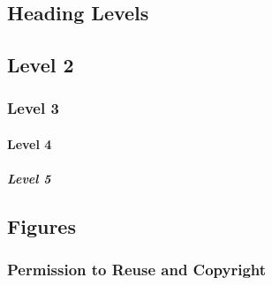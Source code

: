 \documentclass[utf8]{frontiersSCNS} %
\begin{document}
\subsection{Heading Levels}


\subsection{Level 2}
\subsubsection{Level 3}
\paragraph{Level 4}
\subparagraph{Level 5}




\subsection{Figures}


\subsubsection{Permission to Reuse and Copyright}
\end{document}
